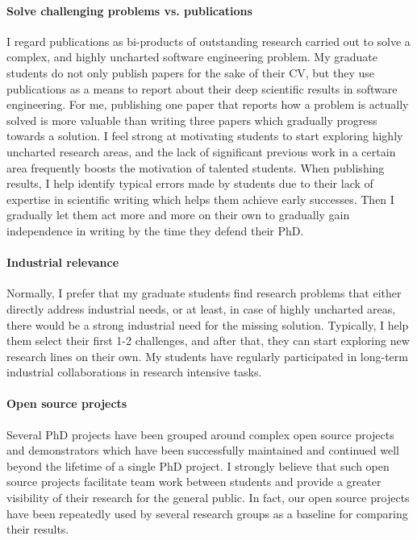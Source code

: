 \documentclass[a4paper,11pt]{report}
\begin{document}
\paragraph{Solve challenging problems vs. publications}
I regard publications as bi-products of outstanding research carried out to solve a complex, and highly uncharted software engineering problem. My graduate students do not only publish papers for the sake of their CV, but they use publications as a means to report about their deep scientific results in software engineering. For me, publishing one paper that reports how a problem is actually solved is more valuable than writing three papers which gradually progress towards a solution. I feel strong at motivating students to start exploring highly uncharted research areas, and the lack of significant previous work in a certain area frequently boosts the motivation of talented students. 
When publishing results, I help identify typical errors made by students due to their lack of expertise in scientific writing which helps them achieve early successes. Then I gradually let them act more and more on their own to gradually gain independence in writing by the time they defend their PhD. 

\paragraph{Industrial relevance}
Normally, I prefer that my graduate students find research problems that either directly address industrial needs, or at least, in case of highly uncharted areas, there would be a strong industrial need for the missing solution. Typically, I help them select their first 1-2 challenges, and after that, they can start exploring new research lines on their own. 
My students have regularly participated in long-term industrial collaborations in research intensive tasks. 

\paragraph{Open source projects}
Several PhD projects have been grouped around complex open source projects and demonstrators which have been successfully maintained and continued well beyond the lifetime of a single PhD project. I strongly believe that such open source projects facilitate team work between students and provide a greater visibility of their research for the general public. In fact, our open source projects have been repeatedly used by several research groups as a baseline for comparing their results. 
\end{document}

